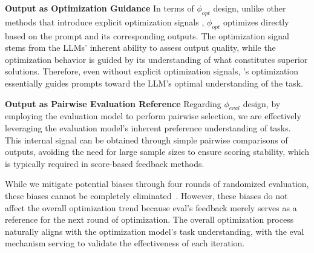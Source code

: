 \textbf{Output as Optimization Guidance}
In terms of $\phi_{opt}$ design, unlike other methods that introduce explicit optimization signals \cite{chris2024pb, mert2024textgrad, reid2023protegi}, $\phi_{opt}$ optimizes directly based on the prompt and its corresponding outputs. The optimization signal stems from the LLMs' inherent ability to assess output quality, while the optimization behavior is guided by its understanding of what constitutes superior solutions. Therefore, even without explicit optimization signals, \ours's optimization essentially guides prompts toward the LLM's optimal understanding of the task.

\textbf{Output as Pairwise Evaluation Reference} 
Regarding $\phi_{eval}$ design, by employing the evaluation model to perform pairwise selection, we are effectively leveraging the evaluation model's inherent preference understanding of tasks. This internal signal can be obtained through simple pairwise comparisons of outputs, avoiding the need for large sample sizes to ensure scoring stability, which is typically required in score-based feedback methods.

 While we mitigate potential biases through four rounds of randomized evaluation, these biases cannot be completely eliminated~\cite{zhou2024zepo}. However, these biases do not affect the overall optimization trend because eval's feedback merely serves as a reference for the next round of optimization. The overall optimization process naturally aligns with the optimization model's task understanding, with the eval mechanism serving to validate the effectiveness of each iteration.



